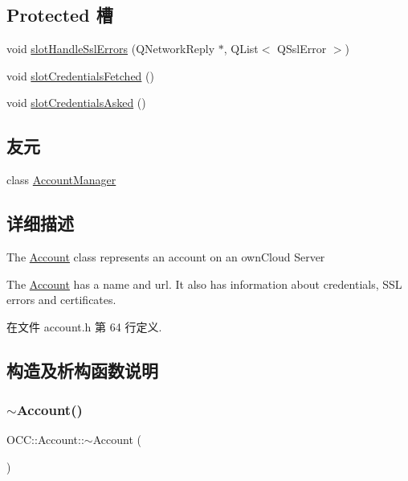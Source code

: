 \subsection*{Protected 槽}
\begin{DoxyCompactItemize}
\item 
void \hyperlink{class_o_c_c_1_1_account_a59548cce5bd18581f28b7c0b3585030d}{slot\+Handle\+Ssl\+Errors} (Q\+Network\+Reply $\ast$, Q\+List$<$ Q\+Ssl\+Error $>$)
\item 
void \hyperlink{class_o_c_c_1_1_account_ac8ecefeaf70607c5c304ef7ed3217f8e}{slot\+Credentials\+Fetched} ()
\item 
void \hyperlink{class_o_c_c_1_1_account_aec35c542cb95b375e8621d92ca34fe00}{slot\+Credentials\+Asked} ()
\end{DoxyCompactItemize}
\subsection*{友元}
\begin{DoxyCompactItemize}
\item 
class \hyperlink{class_o_c_c_1_1_account_ad05046fe3a5656a5f13283c5bcebd22a}{Account\+Manager}
\end{DoxyCompactItemize}


\subsection{详细描述}
The \hyperlink{class_o_c_c_1_1_account}{Account} class represents an account on an own\+Cloud Server

The \hyperlink{class_o_c_c_1_1_account}{Account} has a name and url. It also has information about credentials, S\+SL errors and certificates. 

在文件 account.\+h 第 64 行定义.



\subsection{构造及析构函数说明}
\mbox{\label{class_o_c_c_1_1_account_ad2185f0518cf08d14c612083ab5d6731}} 
\subsubsection{\texorpdfstring{$\sim$\+Account()}{~Account()}}
{\footnotesize\ttfamily O\+C\+C\+::\+Account\+::$\sim$\+Account (\begin{DoxyParamCaption}{ }\end{DoxyParamCaption})}



